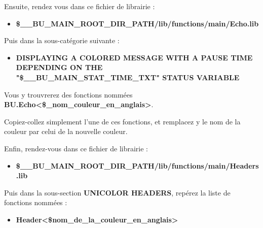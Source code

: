 \documentclass[a4paper,10pt]{article}
\begin{document}
    \begin{justify}
        Ensuite, rendez vous dans ce fichier de librairie :

        \begin{itemize}
            \item \textbf{\color{vars}\$\_\_BU\_MAIN\_ROOT\_DIR\_PATH\color{path}/lib/functions/main/Echo.lib}
        \end{itemize}
    \end{justify}

    \begin{justify}
        Puis dans la sous-catégorie suivante :

        \begin{itemize}
            \item \textbf{DISPLAYING A COLORED MESSAGE WITH A PAUSE TIME DEPENDING ON THE\\ "\$\_\_BU\_MAIN\_STAT\_TIME\_TXT" STATUS VARIABLE}
        \end{itemize}
    \end{justify}

    \begin{justify}
        Vous y trouvrerez des fonctions nommées \textbf{\color{mauve}BU.Echo<\$\_nom\_couleur\_en\_anglais>}.
    \end{justify}

    \begin{justify}
    Copiez-collez simplement l'une de ces fonctions, et remplacez y le nom de la couleur par celui de la nouvelle couleur.\\\mbox{}
    \end{justify}

    \begin{justify}
        Enfin, rendez-vous dans ce fichier de librairie :

        \begin{itemize}
            \item \textbf{\color{vars}\$\_\_BU\_MAIN\_ROOT\_DIR\_PATH\color{path}/lib/functions/main/Headers.lib}
        \end{itemize}
    \end{justify}

    \begin{justify}
        Puis dans la sous-section \textbf{UNICOLOR HEADERS}, repérez la liste de fonctions nommées :

        \begin{itemize}
            \item \textbf{\color{mauve}Header<\$nom\_de\_la\_couleur\_en\_anglais>}
        \end{itemize}
    \end{justify}
\end{document}
